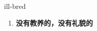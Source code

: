 
\begin{frame}
{\huge ill-bred}
\begin{center}
\begin{enumerate}\Large
  \item \textbf{没有教养的，没有礼貌的}
\end{enumerate}
\end{center}
\end{frame}
